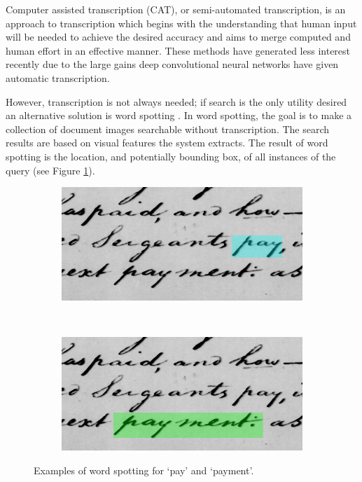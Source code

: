 \documentclass[ms,electronic,twosidetoc,letterpaper,chaptercenter,parttop,lol,lof,lot]{byumsphd}
\begin{document}
Computer assisted transcription (CAT), or semi-automated transcription, is an approach to transcription which begins with the understanding that human input will be needed to achieve the desired accuracy and aims to merge computed and human effort in an effective manner. 
These methods have generated less interest recently due to the large gains deep convolutional neural networks have given automatic transcription.

However, transcription is not always needed; if search is the only utility desired an alternative solution is word spotting \cite{manmatha1996}. In word spotting, the goal is to make a collection of document images searchable without transcription. The search results are based on visual features the system extracts. The result of word spotting is the location, and potentially bounding box, of all instances of the query (see Figure \ref{fig:explain_spotting}). 

\begin{figure}[t]
    \begin{subfigure}{0.46\textwidth}
    		\centering
    		\includegraphics[width=\textwidth]{spotting_explination_pay}
    	\end{subfigure}
    	~
    	\begin{subfigure}{0.46\textwidth}
    		\centering
    		\includegraphics[width=\textwidth]{spotting_explination_payment}
    	\end{subfigure}
    	\caption{Examples of word spotting for `pay' and `payment'.}
    	\label{fig:explain_spotting}
\end{figure}
\end{document}
